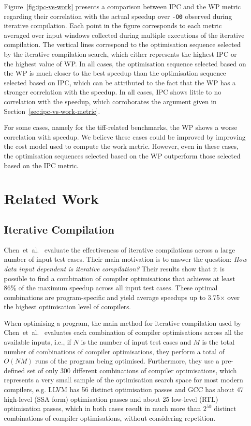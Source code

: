 \documentclass[sigplan,10pt]{acmart}
\theoremstyle{definition}
\newcommand{\etal}{et~al.}
\newcommand{\itercomp}{{iterative compilation}}
\newcommand{\IterComp}{{Iterative Compilation}}
\begin{document}
Figure~\ref{fig:ipc-vs-work} presents a comparison between IPC and the WP metric regarding their correlation with the actual speedup over \verb|-O0| observed during {\itercomp}.
Each point in the figure corresponds to each metric averaged over input windows collected during multiple executions of the {\itercomp}.
The vertical lines correspond to the optimisation sequence selected by the {\itercomp} search, which either represents the highest IPC or the highest value of WP.
In all cases, the optimisation sequence selected based on the WP is much closer to the best speedup than the optimisation sequence selected based on IPC, which can be attributed to the fact that the WP has a stronger correlation with the speedup.
In all cases, IPC shows little to no correlation with the speedup, which corroborates the argument given in Section~\ref{sec:ipc-vs-work-metric}.

For some cases, namely for the tiff-related benchmarks, the WP shows a worse correlation with speedup.
We believe these cases could be improved by improving the cost model used to compute the work metric.
However, even in these cases, the optimisation sequences selected based on the WP outperform those selected based on the IPC metric.

\section{Related Work}

\subsection{{\IterComp}}

Chen~\etal~\cite{chen10,chen12a} evaluate the effectiveness of iterative compilations across a large number of input test cases.
Their main motivation is to answer the question:
\textit{How data input dependent is {\itercomp}?}
Their results show that it is possible to find a combination of compiler optimisations that achieves at least 86\% of the maximum speedup across all input test cases.
These optimal combinations are program-specific and yield average speedups up to 3.75$\times$ over the highest optimisation level of compilers.

When optimising a program, the main method for {\itercomp} used by Chen~\etal~\cite{chen10,chen12a} evaluates each combination of compiler optimisations across all the available inputs, i.e., if $N$ is the number of input test cases and $M$ is the total number of combinations of compiler optimisations, they perform a total of $O(NM)$ runs of the program being optimised.
Furthermore, they use a pre-defined set of only 300 different combinations of compiler optimisations, which represents a very small sample of the optimisation search space for most modern compilers, e.g.
LLVM has 56 distinct optimisation passes and GCC has about 47 high-level (SSA form) optimisation passes and about 25 low-level (RTL) optimisation passes, which in both cases result in much more than $2^{50}$ distinct combinations of compiler optimisations, without considering repetition.
\end{document}
